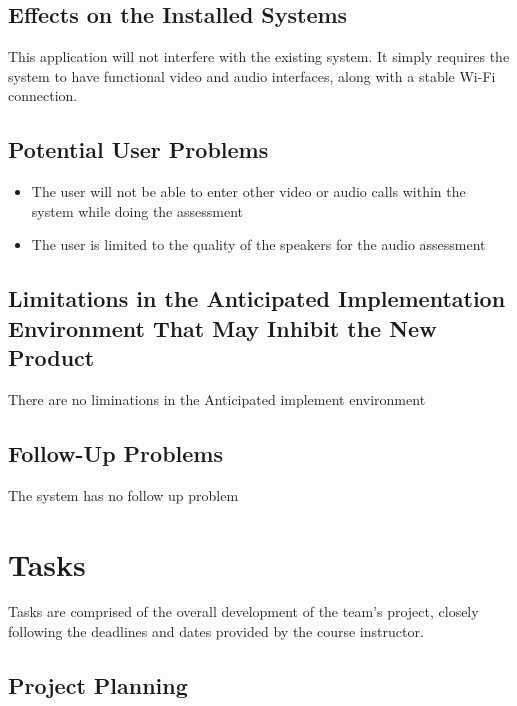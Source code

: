 \documentclass[12pt]{article}
\begin{document}
\subsection{Effects on the Installed Systems}
\hspace{2em}This application will not interfere with the existing system. It simply requires the system to have functional video and audio interfaces, along with a stable Wi-Fi connection.
\subsection{Potential User Problems}
\begin{itemize}
  \item The user will not be able to enter other video or audio calls within the system while doing the assessment
  \item The user is limited to the quality of the speakers for the audio assessment
\end{itemize}
\subsection{Limitations in the Anticipated Implementation Environment That May
Inhibit the New Product}
There are no liminations in the Anticipated implement environment
\subsection{Follow-Up Problems}
The system has no follow up problem

\newpage

\section{Tasks}
\hspace{2em}Tasks are comprised of the overall development of the team's project, closely following the deadlines and dates provided by the course instructor.
\subsection{Project Planning}
\end{document}
